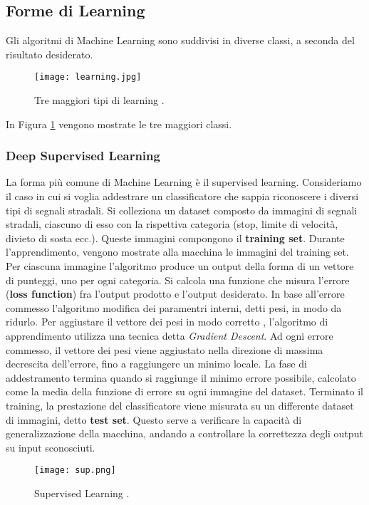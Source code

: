 \subsection{Forme di Learning}
Gli algoritmi di Machine Learning sono suddivisi in diverse classi, a seconda del risultato desiderato.
\begin{figure}
  \texttt{[image: learning.jpg]}
  \caption{Tre maggiori tipi di learning \cite{learn}.}
  \label{fig:ml}
\end{figure}
In Figura \ref{fig:ml} vengono mostrate le tre maggiori classi.
\subsubsection{Deep Supervised Learning}
La forma più comune di Machine Learning è il supervised learning. Consideriamo il caso in cui si voglia addestrare un classificatore
che sappia riconoscere i diversi tipi di segnali stradali. Si colleziona un dataset composto da immagini di segnali stradali, ciascuno di esso con la rispettiva categoria (stop, limite di velocità,
divieto di sosta ecc.). Queste immagini compongono il \textbf{training set}. Durante l'apprendimento, vengono mostrate alla macchina  le immagini del training set. Per ciascuna immagine l'algoritmo produce un output della forma di un vettore di punteggi, uno per ogni categoria.
Si calcola una funzione che misura l'errore (\textbf{loss function}) fra l'output prodotto e l'output desiderato. In base all'errore commesso l'algoritmo modifica dei paramentri interni, detti pesi, 
in modo da ridurlo. Per aggiustare il vettore dei pesi in modo corretto , l'algoritmo di apprendimento utilizza una tecnica detta \emph{Gradient Descent}. Ad ogni errore commesso, il vettore dei pesi viene aggiustato nella direzione di massima decrescita dell'errore, fino a raggiungere un minimo locale. La fase di addestramento termina quando si raggiunge il minimo errore possibile, calcolato come la media della funzione di errore su ogni immagine del dataset.
Terminato il training, la prestazione del classificatore viene misurata su un differente dataset di immagini, detto \textbf{test set}. Questo serve a verificare
la capacità di generalizzazione della macchina, andando a controllare la correttezza degli output su input sconosciuti.

\begin{figure}
  \texttt{[image: sup.png]}
  \caption{Supervised Learning \cite{sup}.}
  \label{fig:sup}
\end{figure}

